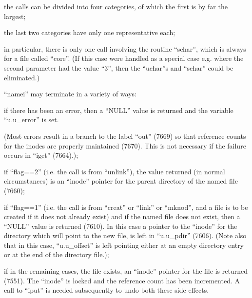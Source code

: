 \item [(b)] the calls can  be  divided  into
four  categories,  of  which the
first is by far the largest;

\item[(c)] the  last  two  categories  have
only one representative each;

\item[(d)] in particular, there is only one
call   involving   the   routine
``schar'', which is always  for  a
file  called  ``core''.  (If  this
case were handled as  a  special
case   e.g.   where  the  second
parameter  had  the  value  ``3'',
then  the  ``uchar''s  and ``schar''
could be eliminated.)
\ed


\noindent ``namei'' may terminate in a  variety  of
ways:

\bd
\item[(a)]  if there has been an error, then
     a  ``NULL''  value is returned and
     the variable ``u.u\_error'' is set.

(Most errors result in a  branch
to  the  label  ``out''  (7669) so
that reference  counts  for  the
inodes are properly maintained
(7670). This is not necessary if
the  failure  occurs  in  ``iget''
(7664).);



\item[(b)]  if ``flag==2'' (i.e. the  call  is
     from    ``unlink''),   the   value
     returned   (in    normal    circumstances)    is   an   ``inode''
     pointer for the parent directory
     of the named file (7660);

\item[(c)]  if ``flag==1'' (i.e. the  call  is
     from   ``creat''   or   ``link''  or
     ``mknod'', and a  file  is  to  be
     created  if  it does not already
     exist) and  if  the  named  file
     does  not  exist,  then a ``NULL''
     value  is  returned  (7610).  In
     this   case  a  pointer  to  the
     ``inode'' for the directory  which
     will  point  to the new file, is
     left in ``u.u\_pdir'' (7606). (Note
     also    that   in   this   case,
     ``u.u\_offset''  is  left  pointing
     either  at  an  empty  directory
     entry  or  at  the  end  of  the
     directory file.);

\item[(d)] if  in the remaining cases,  the
file  exists, an ``inode'' pointer
for the file is returned (7551).
The  ``inode''  is  locked and the
reference count has been  incremented.   A  call  to  ``iput'' is
needed subsequently to undo both
these side effects.
\ed



